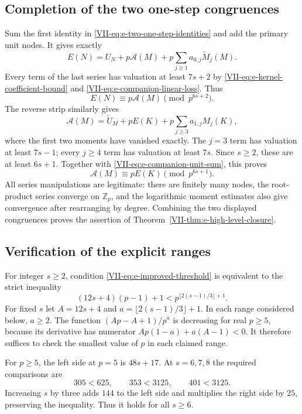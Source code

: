 \documentclass[11pt,letterpaper]{article}
\numberwithin{equation}{section}
\begin{document}
\subsection{Completion of the two one-step congruences}
Sum the first identity in \eqref{VII-eq:e-two-one-step-identities} and
add the primary unit nodes. It gives exactly
\[
 E(N)=U_N+p\mathcal A(M)
             +p\sum_{j\ge1}a_{0,j}\widetilde M_j(M).
\]
Every term of the last series has valuation at least $7s+2$ by
\eqref{VII-eq:e-kernel-coefficient-bound} and
\eqref{VII-eq:e-companion-linear-loss}. Thus
\begin{equation}\label{VII-eq:e-primary-one-step-congruence}
 E(N)\equiv p\mathcal A(M)\pmod{p^{6s+2}}.
\end{equation}
The reverse strip similarly gives
\[
 \mathcal A(M)=\widetilde U_M+pE(K)
                         +p\sum_{j\ge3}a_{1,j}M_j(K),
\]
where the first two moments have vanished exactly. The $j=3$ term
has valuation at least $7s-1$; every $j\ge4$ term has valuation at
least $7s$. Since $s\ge2$, these are at least $6s+1$.
Together with \eqref{VII-eq:e-companion-unit-sum}, this proves
\begin{equation}\label{VII-eq:e-companion-one-step-congruence}
 \mathcal A(M)\equiv pE(K)\pmod{p^{6s+1}}.
\end{equation}
All series manipulations are legitimate: there are finitely many
nodes, the root-product series converge on $\mathbb Z_p$, and the
logarithmic moment estimates also give convergence after rearranging
by degree. Combining the two displayed congruences proves the
assertion of Theorem~\ref{VII-thm:e-high-level-closure}.

\subsection{Verification of the explicit ranges}
For integer $s\ge2$, condition \eqref{VII-eq:e-improved-threshold} is
equivalent to the strict inequality
\begin{equation}\label{VII-eq:e-threshold-power-form}
 (12s+4)(p-1)+1
 <p^{\lfloor2(s-1)/3\rfloor+1}.
\end{equation}
For fixed $s$ let $A=12s+4$ and $a=\lfloor2(s-1)/3\rfloor+1$.
In each range considered below, $a\ge2$. The function
$(Ap-A+1)/p^a$ is decreasing for real $p\ge5$, because its
derivative has numerator $Ap(1-a)+a(A-1)<0$. It therefore suffices
to check the smallest value of $p$ in each claimed range.

For $p\ge5$, the left side at $p=5$ is $48s+17$.
At $s=6,7,8$ the required comparisons are
\[
 305<625,\qquad353<3125,\qquad401<3125.
\]
Increasing $s$ by three adds $144$ to the left side and multiplies
the right side by $25$, preserving the inequality. Thus it holds
for all $s\ge6$.
\end{document}
